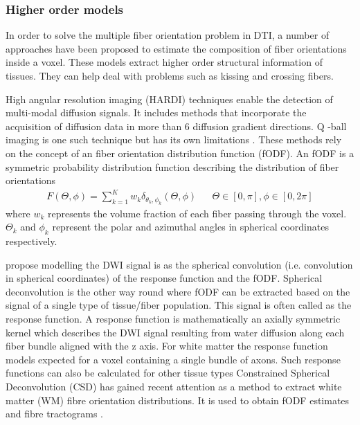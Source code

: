 \documentclass[msthesis.tex]{subfiles}
\begin{document}
\subsubsection{Higher order models}
\label{sec:highermodels}

In order to solve the multiple fiber orientation problem in DTI, a number of approaches have been proposed to estimate the composition of fiber orientations inside a voxel. These models extract higher order structural information of tissues. They can help deal with problems such as kissing and crossing fibers. 

High angular resolution imaging (HARDI) techniques enable the detection of multi-modal diffusion signals. It includes methods that incorporate the acquisition of diffusion data in more than 6 diffusion gradient directions. Q -ball imaging is one such technique but has its own limitations \cite{TOURNIER20041176}. These methods rely on the concept of an fiber orientation distribution function (fODF). An fODF is a symmetric probability distribution function describing the distribution of fiber orientations
\begin{align}
  F(\Theta, \phi) = \sum_{k=1}^{K} w_k \delta_{\theta_k, \phi_k}(\Theta, \phi) &
 & \Theta \in [0, \pi], \phi \in [0,2\pi]
\end{align}
where $w_k$ represents the volume fraction of each fiber passing through the voxel. $\Theta_k$ and $\phi_k$ represent the polar and azimuthal angles in spherical coordinates respectively.

 \cite{tournier2004direct} propose modelling the DWI signal is as the spherical convolution (i.e. convolution in spherical coordinates) of the response function and the fODF. Spherical deconvolution is the other way round where fODF can be extracted based on the signal of a single type of tissue/fiber population. This signal is often called as the response function. A response function is mathematically an axially symmetric kernel which describes the DWI signal resulting from water diffusion along each fiber bundle aligned with the z axis. For white matter the response function models expected for a voxel containing a single bundle of axons. Such response functions can also be calculated for other tissue types
Constrained Spherical Deconvolution (CSD) has gained recent attention as a method to extract white matter (WM) fibre orientation distributions. It is used to obtain fODF estimates and fibre tractograms \cite{JEURISSEN2014411}.
\end{document}
